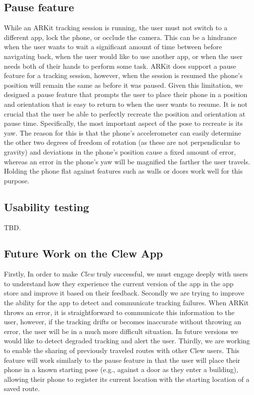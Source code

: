 \documentclass[chi_draft]{sigchi}
\begin{document}
\subsection{Pause feature}
While an ARKit tracking session is running, the user must not switch to a different app, lock the phone, or occlude the camera.  This can be a hindrance when the user wants to wait a significant amount of time between before navigating back, when the user would like to use another app, or when the user needs both of their hands to perform some task.  ARKit does support a pause feature for a tracking session, however, when the session is resumed the phone's position will remain the same as before it was paused.  Given this limitation, we designed a pause feature that prompts the user to place their phone in a position and orientation that is easy to return to when the user wants to resume.  It is not crucial that the user be able to perfectly recreate the position and orientation at pause time.  Specifically, the most important aspect of the pose to recreate is its yaw.  The reason for this is that the phone's accelerometer can easily determine the other two degrees of freedom of rotation (as these are not perpendicular to gravity) and deviations in the phone's position cause a fixed amount of error, whereas an error in the phone's yaw will be magnified the farther the user travels.  Holding the phone flat against features such as walls or doors work well for this purpose.  

\subsection{Usability testing}
TBD.

\subsection{Future Work on the Clew App}
Firstly, In order to make \emph{Clew} truly successful, we must engage deeply with users to understand how they experience the current version of the app in the app store and improve it based on their feedback.  Secondly we are trying to improve the ability for the app to detect and communicate tracking failures.  When ARKit throws an error, it is straightforward to communicate this information to the user, however, if the tracking drifts or becomes inaccurate without throwing an error, the user will be in a much more difficult situation.  In future versions we would like to detect degraded tracking and alert the user.  Thirdly, we are working to enable the sharing of previously traveled routes with other Clew users.  This feature will work similarly to the pause feature in that the user will place their phone in a known starting pose (e.g., against a door as they enter a building), allowing their phone to register its current location with the starting location of a saved route.
\end{document}
